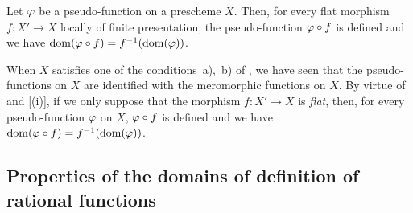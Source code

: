 \begin{corollary}[20.3.12]
\label{IV.20.3.12}
Let $\varphi$ be a pseudo-function on a prescheme $X$.
Then, for every flat morphism $f:X'\to X$ locally of finite presentation, the pseudo-function $\varphi\circ f$ is defined and we have $\operatorname{dom}(\varphi\circ f)=f^{-1}(\operatorname{dom}(\varphi))$.
\end{corollary}

\begin{remark}[20.3.13]
\label{IV.20.3.13}
When $X$ satisfies one of the conditions~a),~b) of , we have seen  that the pseudo-functions on $X$ are identified with the meromorphic functions on $X$.
By virtue of  and [(i)], if we only suppose that the morphism $f:X'\to X$ is \emph{flat}, then, for every pseudo-function $\varphi$ on $X$, $\varphi\circ f$ is defined and we have $\operatorname{dom}(\varphi\circ f)=f^{-1}(\operatorname{dom}(\varphi))$.
\end{remark}


\subsection{Properties of the domains of definition of rational functions}

